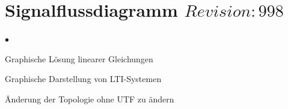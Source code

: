 \section{Signalflussdiagramm  \tiny{$Revision: 998 $}}
\begin{list}{$\bullet$}{\setlength{\itemsep}{0cm} \setlength{\parsep}{0cm} \setlength{\topsep}{0cm}} 
  \item Graphische Lösung linearer Gleichungen
  \item Graphische Darstellung von LTI-Systemen
  \item Änderung der Topologie ohne UTF zu ändern
\end{list}


